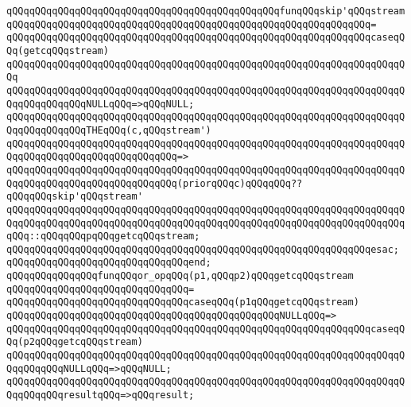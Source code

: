 \verb|qQQqqQQqqQQqqQQqqQQqqQQqqQQqqQQqqQQqqQQqqQQqqQQqfunqQQqskip'qQQqstream|\newline
\verb|qQQqqQQqqQQqqQQqqQQqqQQqqQQqqQQqqQQqqQQqqQQqqQQqqQQqqQQqqQQqqQQq=|\newline
\verb|qQQqqQQqqQQqqQQqqQQqqQQqqQQqqQQqqQQqqQQqqQQqqQQqqQQqqQQqqQQqqQQqcaseqQQq(getcqQQqstream)|\newline
\verb|qQQqqQQqqQQqqQQqqQQqqQQqqQQqqQQqqQQqqQQqqQQqqQQqqQQqqQQqqQQqqQQqqQQqqQQq|\newline
\verb|qQQqqQQqqQQqqQQqqQQqqQQqqQQqqQQqqQQqqQQqqQQqqQQqqQQqqQQqqQQqqQQqqQQqqQQqqQQqqQQqqQQqNULLqQQq=>qQQqNULL;|\newline
\newline
\verb|qQQqqQQqqQQqqQQqqQQqqQQqqQQqqQQqqQQqqQQqqQQqqQQqqQQqqQQqqQQqqQQqqQQqqQQqqQQqqQQqqQQqTHEqQQq(c,qQQqstream')|\newline
\verb|qQQqqQQqqQQqqQQqqQQqqQQqqQQqqQQqqQQqqQQqqQQqqQQqqQQqqQQqqQQqqQQqqQQqqQQqqQQqqQQqqQQqqQQqqQQqqQQqqQQq=>|\newline
\verb|qQQqqQQqqQQqqQQqqQQqqQQqqQQqqQQqqQQqqQQqqQQqqQQqqQQqqQQqqQQqqQQqqQQqqQQqqQQqqQQqqQQqqQQqqQQqqQQqqQQq(priorqQQqc)qQQqqQQq??qQQqqQQqskip'qQQqstream'|\newline
\verb|qQQqqQQqqQQqqQQqqQQqqQQqqQQqqQQqqQQqqQQqqQQqqQQqqQQqqQQqqQQqqQQqqQQqqQQqqQQqqQQqqQQqqQQqqQQqqQQqqQQqqQQqqQQqqQQqqQQqqQQqqQQqqQQqqQQqqQQqqQQqqQQq::qQQqqQQqpqQQqgetcqQQqstream;|\newline
\verb|qQQqqQQqqQQqqQQqqQQqqQQqqQQqqQQqqQQqqQQqqQQqqQQqqQQqqQQqqQQqqQQqesac;|\newline
\verb|qQQqqQQqqQQqqQQqqQQqqQQqqQQqqQQqend;|\newline
\newline
\newline
\verb|qQQqqQQqqQQqqQQqfunqQQqor_opqQQq(p1,qQQqp2)qQQqgetcqQQqstream|\newline
\verb|qQQqqQQqqQQqqQQqqQQqqQQqqQQqqQQq=|\newline
\verb|qQQqqQQqqQQqqQQqqQQqqQQqqQQqqQQqcaseqQQq(p1qQQqgetcqQQqstream)|\newline
\newline
\verb|qQQqqQQqqQQqqQQqqQQqqQQqqQQqqQQqqQQqqQQqqQQqqQQqNULLqQQq=>|\newline
\verb|qQQqqQQqqQQqqQQqqQQqqQQqqQQqqQQqqQQqqQQqqQQqqQQqqQQqqQQqqQQqqQQqcaseqQQq(p2qQQqgetcqQQqstream)|\newline
\verb|qQQqqQQqqQQqqQQqqQQqqQQqqQQqqQQqqQQqqQQqqQQqqQQqqQQqqQQqqQQqqQQqqQQqqQQqqQQqqQQqNULLqQQq=>qQQqNULL;|\newline
\verb|qQQqqQQqqQQqqQQqqQQqqQQqqQQqqQQqqQQqqQQqqQQqqQQqqQQqqQQqqQQqqQQqqQQqqQQqqQQqqQQqresultqQQq=>qQQqresult;|\newline
